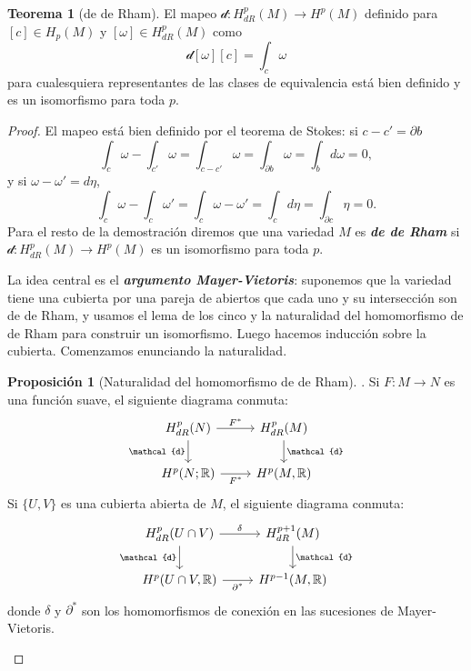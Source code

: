 \documentclass[spanish]{article}
\theoremstyle{definition}
\newtheorem*{teo}{Teorema}
\newtheorem*{prop}{Proposición}
\newcommand{\R}{\mathbb{R}}
\begin{document}
	\begin{teo}[de de Rham]
		El  mapeo $\mathcal{d}:H^p_{dR}(M)\to H^p(M)$ definido para $[c]\in H_p(M)$ y $[\omega]\in H^p_{dR}(M)$ como
		\[\mathcal{d}[\omega][c]=\int_c\omega\]
		para cualesquiera representantes de las clases de equivalencia está bien definido y es un isomorfismo para toda $p$.
	\end{teo}
	\begin{proof}
		El mapeo está bien definido por el teorema de Stokes: si $c-c'=\partial b$
		\[\int_c\omega-\int_{c'}\omega=\int_{c-c'}\omega=\int_{\partial b}\omega=\int_bd\omega=0,\]
		y si $\omega-\omega'=d\eta$,
		\[\int_c\omega-\int_c\omega'=\int_c\omega-\omega'=\int_cd\eta=\int_{\partial c}\eta=0.\]
		Para el resto de la demostración diremos que una variedad $M$ es \textbf{\textit{de de Rham}} si $\mathcal{d}:H^p_{dR}(M)\to H^p(M)$ es un isomorfismo para toda $p$.
		
		La idea central es el \textbf{\textit{argumento Mayer-Vietoris}}: suponemos que la variedad tiene una cubierta por una pareja de abiertos que cada uno y su intersección son de de Rham, y usamos el lema de los cinco y la naturalidad del homomorfismo de de Rham para construir un isomorfismo. Luego hacemos inducción sobre la cubierta. Comenzamos enunciando la naturalidad.
		 \begin{prop}[Naturalidad del homomorfismo de de Rham]. Si $F:M\to N$ es una función suave, el siguiente diagrama conmuta:
			\[\begin{tikzcd}
				H_{dR}^p(N)\arrow[r,"F^*"]\arrow[d,"\mathcal{d}",swap]&H_{dR}^p(M)\arrow[d,"\mathcal{d}"]\\
				H^p(N;\R)\arrow[r,swap,"F^*"]&H^p(M,\R)
			\end{tikzcd}\]
			Si $\{U,V\}$ es una cubierta abierta de $M$, el siguiente diagrama conmuta:
			\[\begin{tikzcd}
				H^p_{dR}(U\cap V)\arrow[r,"\delta"]\arrow[d,"\mathcal{d}",swap]&H^{p+1}_{dR}(M)\arrow[d,"\mathcal{d}"]\\
				H^p(U\cap V,\R)\arrow[r,"\partial^*",swap]&H^{p-1}(M,\R)
			\end{tikzcd}\]
			donde $\delta$ y $\partial^*$ son los homomorfismos de conexión en las sucesiones de Mayer-Vietoris.
			 \end{prop}
			

\end{proof}
\end{document}
